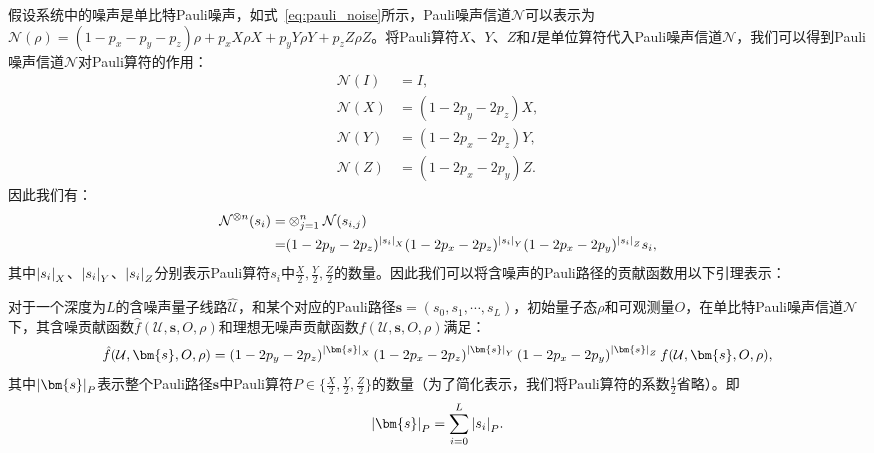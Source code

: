 假设系统中的噪声是单比特Pauli噪声，如式~\eqref{eq:pauli_noise}所示，Pauli噪声信道$\mathcal{N}$可以表示为$\mathcal{N}(\rho) = (1-p_x-p_y-p_z)\rho + p_x X\rho X + p_y Y\rho Y + p_z Z\rho Z$。将Pauli算符$X$、$Y$、$Z$和$I$是单位算符代入Pauli噪声信道$\mathcal{N}$，我们可以得到Pauli噪声信道$\mathcal{N}$对Pauli算符的作用：
\begin{equation}
    \begin{aligned}
        \mathcal{N}(I) &= I,\\
        \mathcal{N}(X) &= (1-2p_y-2p_z)X,\\
        \mathcal{N}(Y) &= (1-2p_x-2p_z)Y,\\
        \mathcal{N}(Z) &= (1-2p_x-2p_y)Z.
    \end{aligned}
\end{equation}
因此我们有：
\begin{equation}
    \begin{aligned}
        \mathcal{N}^{\otimes n}(s_i)= &\otimes_{j=1}^{n}\mathcal{N}(s_{i,j})\\
        =&(1-2p_y-2p_z)^{\abs{s_i}_X}(1-2p_x-2p_z)^{\abs{s_i}_Y}(1-2p_x-2p_y)^{\abs{s_i}_Z}s_i,
    \end{aligned}
\end{equation}
其中$\abs{s_i}_X$、$\abs{s_i}_Y$、$\abs{s_i}_Z$分别表示Pauli算符$s_i$中$\frac{X}{2},\frac{Y}{2},\frac{Z}{2}$的数量。因此我们可以将含噪声的Pauli路径的贡献函数用以下引理表示：
\begin{lemma}\label{lemma:noise}
    对于一个深度为$L$的含噪声量子线路$\widehat{\mathcal{U}}$，和某个对应的Pauli路径$\bm{s}= (s_0, s_1, \cdots, s_L)$，初始量子态$\rho$和可观测量$O$，在单比特Pauli噪声信道$\mathcal{N}$下，其含噪贡献函数$\hat{f}(\mathcal{U},\bm{s},O,\rho)$和理想无噪声贡献函数$f(\mathcal{U},\bm{s},O,\rho)$满足：
    \begin{equation}
        \hat{f}(\mathcal{U},\bm{s},O,\rho)=\left(1-2p_y-2p_z\right)^{\abs{\bm{s}}_X}\left(1-2p_x-2p_z\right)^{\abs{\bm{s}}_Y}\left(1-2p_x-2p_y\right)^{\abs{\bm{s}}_Z}f(\mathcal{U},\bm{s},O,\rho),
    \end{equation}
    其中$\abs{\bm{s}}_P$表示整个Pauli路径$\bm{s}$中Pauli算符$P\in \{\frac{X}{2},\frac{Y}{2},\frac{Z}{2}\}$的数量（为了简化表示，我们将Pauli算符的系数$\frac{1}{2}$省略）。即
    \begin{equation}
        \abs{\bm{s}}_P = \sum_{i=0}^{L}\abs{s_i}_P.
    \end{equation}
\end{lemma}


